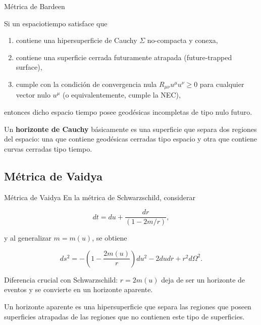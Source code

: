 \documentclass[t]{beamer}
\numberwithin{equation}{section}
\begin{document}
\begin{frame}{Métrica de Bardeen}
\begin{theorem}[Penrose, 1965]
\label{penrose sing thm}
Si un espaciotiempo satisface que

\begin{enumerate}[i]
\item contiene una hipersuperficie de Cauchy $\Sigma$ no-compacta y conexa,

\item contiene una superficie cerrada futuramente atrapada (future-trapped surface),

\item cumple con la condición de convergencia nula $R_{\mu \nu}u^{\mu}u^{\nu} \geq 0$ para cualquier vector nulo $u^{\mu}$ (o equivalentemente, cumple la NEC),
\end{enumerate}

entonces dicho espacio tiempo posee geodésicas incompletas de tipo nulo futuro.
\end{theorem}

Un \textbf{horizonte de Cauchy} básicamente es una superficie que separa dos regiones del espacio: una que contiene geodésicas cerradas tipo espacio y otra que contiene curvas cerradas tipo tiempo.
\end{frame}

\subsection{Métrica de Vaidya}

\begin{frame}{Métrica de Vaidya}
En la métrica de Schwarzschild, considerar

\begin{equation}
dt = du + \frac{dr}{(1 - 2m/r)},
\end{equation}

y al generalizar $m = m(u)$, se obtiene

\begin{equation}
\label{schw-tortoise}
ds^2 = - \left(1- \frac{2m(u)}{r}\right)du^2 - 2dudr + r^2d\Omega^2.
\end{equation}

%
%

Diferencia crucial con Schwarzschild: $r = 2m(u)$ deja de ser un horizonte de eventos y se convierte en un horizonte aparente.

\begin{definition}
Un horizonte aparente es una hipersuperficie que separa las regiones que poseen superficies atrapadas de las regiones que no contienen este tipo de superficies.
\end{definition}

\end{frame}
\end{document}
